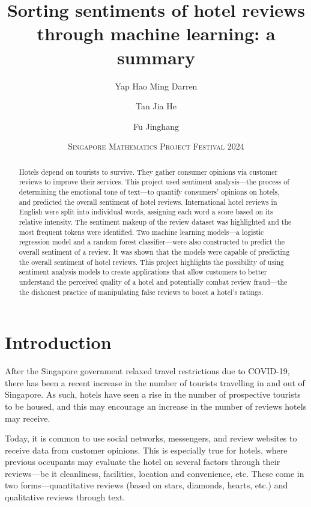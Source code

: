 \documentclass[11pt, a4paper]{pancake-article}
\title{Sorting sentiments of hotel reviews through machine learning: a summary}
\author{Yap Hao Ming Darren \and Tan Jia He \and Fu Jinghang}
\date{\scshape Singapore Mathematics Project Festival 2024}
\begin{document}
\pagestyle{plain}

\maketitle

\begin{abstract}
  Hotels depend on tourists to survive. They gather consumer opinions
  via customer
  reviews to improve their services. This project used sentiment analysis---the
  process of determining the emotional tone of text---to quantify consumers'
  opinions on hotels, and predicted the overall sentiment of hotel reviews.
  International hotel reviews in English were split into individual words,
  assigning each word a score based on its relative intensity. The sentiment
  makeup of the review dataset was highlighted and the most frequent tokens were
  identified. Two machine learning models---a logistic regression
  model and a random
  forest classifier---were also constructed to predict the overall
  sentiment of a
  review. It was shown that the models were capable of predicting the overall
  sentiment of hotel reviews. This project highlights the possibility of using
  sentiment analysis models to create applications that allow
  customers to better
  understand the perceived quality of a hotel and potentially combat
  review fraud---the
  the dishonest practice of manipulating false reviews to boost a
  hotel's ratings.
\end{abstract}

\section{Introduction}
After the Singapore government relaxed travel restrictions due to COVID-19,
there has been a recent increase in the number of tourists travelling
in and out of Singapore.
As such, hotels have seen a rise in the number of prospective
tourists to be housed,
and this may encourage an increase in the number of reviews hotels may receive.

Today, it is common to use social networks, messengers, and review websites
to receive data from customer opinions. This is especially true for hotels,
where previous occupants may evaluate the hotel on several factors through their
reviews---be it cleanliness, facilities, location and convenience, etc.
These come in two forms---quantitative reviews (based on stars, diamonds,
hearts, etc.) and qualitative reviews through text.
\end{document}
